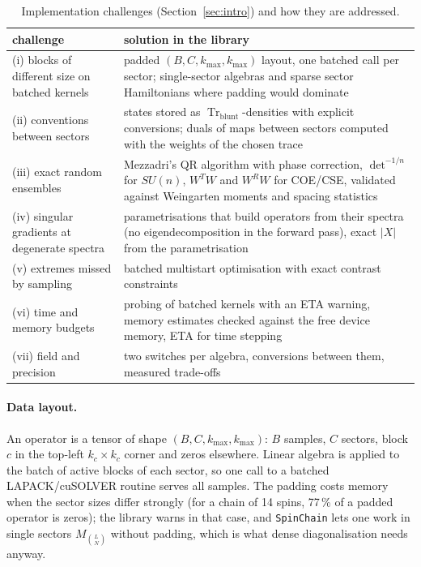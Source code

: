\documentclass[11pt]{article}
\DeclareMathOperator{\Tr}{Tr}
\begin{document}
\begin{table}[h]
\centering\footnotesize
\begin{tabular}{p{}p{}}
\toprule
challenge & solution in the library\\
\midrule
(i) blocks of different size on batched kernels & padded $(B,C,k_{\max},k_{\max})$ layout, one batched call per
sector; single-sector algebras and sparse sector Hamiltonians where padding would dominate\\
(ii) conventions between sectors & states stored as $\Tr_{\mathrm{blunt}}$-densities with explicit conversions;
duals of maps between sectors computed with the weights of the chosen trace\\
(iii) exact random ensembles & Mezzadri's QR algorithm with phase correction, $\det^{-1/n}$ for $SU(n)$, $W^TW$ and
$W^RW$ for COE/CSE, validated against Weingarten moments and spacing statistics\\
(iv) singular gradients at degenerate spectra & parametrisations that build operators from their spectra
(no eigendecomposition in the forward pass), exact $|X|$ from the parametrisation\\
(v) extremes missed by sampling & batched multistart optimisation with exact contrast constraints\\
(vi) time and memory budgets & probing of batched kernels with an ETA warning, memory estimates checked against the
free device memory, ETA for time stepping\\
(vii) field and precision & two switches per algebra, conversions between them, measured trade-offs\\
\bottomrule
\end{tabular}
\caption{Implementation challenges (Section~\ref{sec:intro}) and how they are addressed.}
\label{tab:challenges}
\end{table}

\paragraph{Data layout.} An operator is a tensor of shape $(B,C,k_{\max},k_{\max})$: $B$ samples, $C$
sectors, block $c$ in the top-left $k_c\times k_c$ corner and zeros elsewhere. Linear algebra is applied
to the batch of active blocks of each sector, so one call to a batched LAPACK/cuSOLVER routine serves all
samples. The padding costs memory when the sector sizes differ strongly (for a chain of 14 spins,
77\,\% of a padded operator is zeros); the library warns in that case, and \texttt{SpinChain} lets one work
in single sectors $M_{\binom LN}$ without padding, which is what dense diagonalisation needs anyway.
\end{document}
